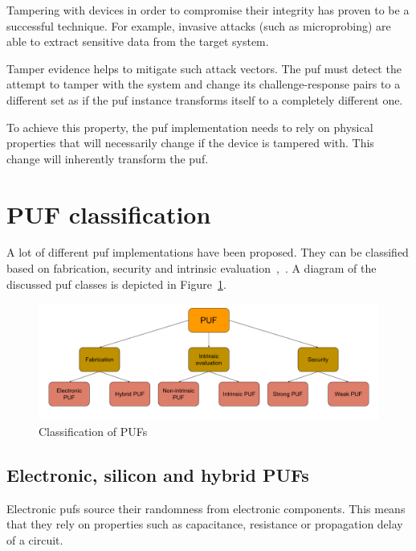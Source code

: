 Tampering with devices in order to compromise their integrity has proven to be a successful technique. For example, invasive attacks (such as microprobing) are able to extract sensitive data from the target system.~\cite{Kommerling1999}

Tamper evidence helps to mitigate such attack vectors. The \gls{puf} must detect the attempt to tamper with the system and change its challenge-response pairs to a different set as if the \gls{puf} instance transforms itself to a completely different one.

To achieve this property, the \gls{puf} implementation needs to rely on physical properties that will necessarily change if the device is tampered with. This change will inherently transform the \gls{puf}.

\section{PUF classification}

A lot of different \gls{puf} implementations have been proposed. They can be classified based on fabrication, security and intrinsic evaluation~\cite{Shital2017},~\cite{McGrath2019}. A diagram of the discussed \gls{puf} classes is depicted in Figure~\ref{fig:classification}.

\begin{figure}[ht!]
    \centering
    \captionsetup{justification=centering,margin=0.5cm}
    \includegraphics[width=\textwidth]{images/classification}
    \caption{Classification of PUFs}
    \label{fig:classification}
\end{figure}

\subsection{Electronic, silicon and hybrid PUFs}

Electronic \glspl{puf} source their randomness from electronic components. This means that they rely on properties such as capacitance, resistance or propagation delay of a circuit.

